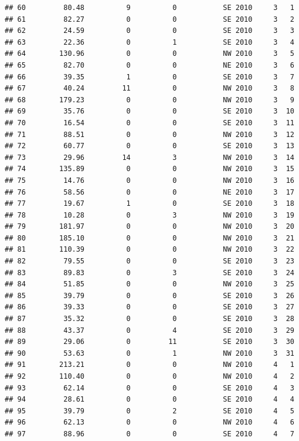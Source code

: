 \documentclass[
]{article}
\begin{document}
\begin{verbatim}
## 60         80.48          9          0           SE 2010     3   1
## 61         82.27          0          0           SE 2010     3   2
## 62         24.59          0          0           SE 2010     3   3
## 63         22.36          0          1           SE 2010     3   4
## 64        130.96          0          0           NW 2010     3   5
## 65         82.70          0          0           NE 2010     3   6
## 66         39.35          1          0           SE 2010     3   7
## 67         40.24         11          0           NW 2010     3   8
## 68        179.23          0          0           NW 2010     3   9
## 69         35.76          0          0           SE 2010     3  10
## 70         16.54          0          0           SE 2010     3  11
## 71         88.51          0          0           NW 2010     3  12
## 72         60.77          0          0           SE 2010     3  13
## 73         29.96         14          3           NW 2010     3  14
## 74        135.89          0          0           NW 2010     3  15
## 75         14.76          0          0           NW 2010     3  16
## 76         58.56          0          0           NE 2010     3  17
## 77         19.67          1          0           SE 2010     3  18
## 78         10.28          0          3           NW 2010     3  19
## 79        181.97          0          0           NW 2010     3  20
## 80        185.10          0          0           NW 2010     3  21
## 81        110.39          0          0           NW 2010     3  22
## 82         79.55          0          0           SE 2010     3  23
## 83         89.83          0          3           SE 2010     3  24
## 84         51.85          0          0           NW 2010     3  25
## 85         39.79          0          0           SE 2010     3  26
## 86         39.33          0          0           SE 2010     3  27
## 87         35.32          0          0           SE 2010     3  28
## 88         43.37          0          4           SE 2010     3  29
## 89         29.06          0         11           SE 2010     3  30
## 90         53.63          0          1           NW 2010     3  31
## 91        213.21          0          0           NW 2010     4   1
## 92        110.40          0          0           NW 2010     4   2
## 93         62.14          0          0           SE 2010     4   3
## 94         28.61          0          0           SE 2010     4   4
## 95         39.79          0          2           SE 2010     4   5
## 96         62.13          0          0           NW 2010     4   6
## 97         88.96          0          0           SE 2010     4   7

\end{verbatim}
\end{document}
